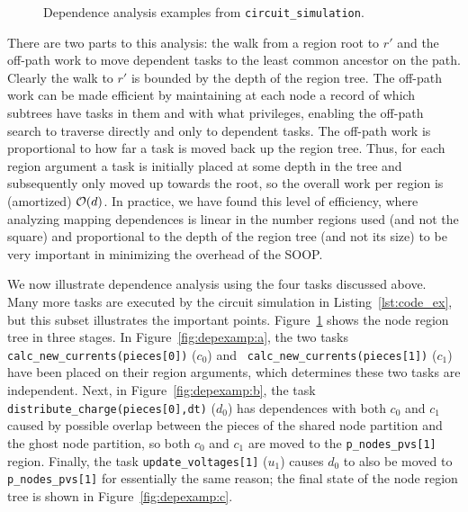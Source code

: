 \begin{figure}
\centering
{}
\label{fig:depexamp}
\caption{Dependence analysis examples from {\tt circuit\_simulation}.}
\end{figure}

There are two parts to this analysis:
the walk from a region root to $r'$ and the off-path work
to move dependent tasks to the least common ancestor on the path.
Clearly the walk to $r'$ is bounded by the depth of the region tree.
The off-path work can be made efficient by maintaining at each node a
record of which subtrees have tasks in them and with what privileges,
enabling the off-path search to traverse directly and only to
dependent tasks.  The off-path work is proportional to how far a task
is moved back up the region tree.  Thus, for each region argument a
task is initially placed at some depth in the tree and subsequently
only moved up towards the root, so the overall work per region is (amortized)
${\cal O}(d)$.  In practice, we have found this level of efficiency,
where analyzing mapping dependences is linear in the number regions used (and not the square) and
proportional to the depth of the region tree (and not its size)
to be very important in minimizing the overhead of the SOOP.

We now illustrate dependence analysis using the four tasks discussed
above.  Many more tasks are executed by the circuit simulation in Listing~\ref{lst:code_ex},
but this subset illustrates the important
points. Figure~\ref{fig:depexamp} shows the node region tree in three
stages.  In Figure~\ref{fig:depexamp:a}, the two tasks
{\tt calc\_new\_currents(pieces[0])} ($c_0$) and {\tt
    calc\_new\_currents(pieces[1])} ($c_1$) have been placed on their region arguments,
  which determines these two tasks are independent.
Next, in Figure~\ref{fig:depexamp:b}, the task {\tt distribute\_charge(pieces[0],dt)} ($d_0$)
has dependences with both $c_0$ and $c_1$ caused by possible overlap between the pieces of the
shared node partition and the ghost node partition, so both $c_0$ and $c_1$ are moved to
the {\tt p\_nodes\_pvs[1]} region.  Finally, the task {\tt update\_voltages[1]} ($u_1$) causes
$d_0$ to also be moved to {\tt p\_nodes\_pvs[1]} for essentially the same reason; the final
state of the node region tree is shown in Figure~\ref{fig:depexamp:c}.


